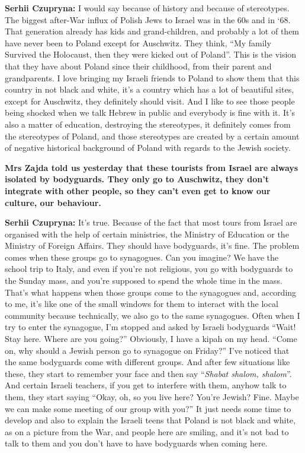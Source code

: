 \textbf{Serhii Czupryna:} I would say because of history and because of stereotypes. The biggest after-War influx of Polish Jews to Israel was in the 60s and in ‘68. That generation already has kids and grand-children, and probably a lot of them have never been to Poland except for Auschwitz. They think, ``My family Survived the Holocaust, then they were kicked out of Poland''. This is the vision that they have about Poland since their childhood, from their parent and grandparents. I love bringing my Israeli friends to Poland to show them that this country in not black and white, it’s a country which has a lot of beautiful sites, except for Auschwitz, they definitely should visit. And I like to see those people being shocked when we talk Hebrew in public and everybody is fine with it. It’s also a matter of education, destroying the stereotypes, it definitely comes from the stereotypes of Poland, and those stereotypes are created by a certain amount of negative historical background of Poland with regards to the Jewish society.\par
\textbf{Mrs Zajda told us yesterday that these tourists from Israel are always isolated by bodyguards. They only go to Auschwitz,  they don’t integrate with other people, so they can’t even get to know our culture, our behaviour.}\par
\textbf{Serhii Czupryna:} It’s true. Because of the fact that most tours from Israel are organised with the help of certain ministries, the Ministry of Education or the Ministry of Foreign Affairs. They should have bodyguards, it’s fine. The problem comes when these groups go to synagogues. Can you imagine? We have the school trip to Italy, and even if you’re not religious, you go with bodyguards to the Sunday mass, and you’re supposed to spend the whole time in the mass. That’s what happens when those groups come to the synagogues and, according to me, it’s like one of the small windows for them to interact with the local community because technically, we also go to the same synagogues. Often when I try to enter the synagogue, I’m stopped and asked by Israeli bodyguards ``Wait! Stay here. Where are you going?'' Obviously, I have a kipah on my head. ``Come on, why should a Jewish person go to synagogue on Friday?'' I’ve noticed that the same bodyguards come with different groups. And after few situations like these, they start to remember your face and then say ``\textit{Shabat shalom, shalom}''. And certain Israeli teachers, if you get to interfere with them, anyhow talk to them, they start saying ``Okay, oh, so you live here? You’re Jewish? Fine. Maybe we can make some meeting of our group with you?'' It just needs some time to develop and also to explain the Israeli teens that Poland is not black and white, as on a picture from the War, and people here are smiling, and it’s not bad to talk to them and you don’t have to have bodyguards when coming here.\par
